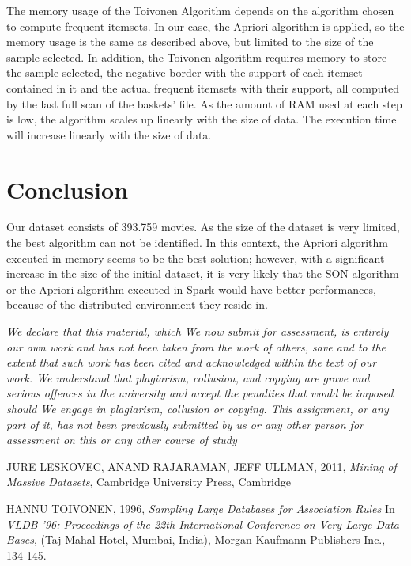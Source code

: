 \documentclass[conference,compsoc]{IEEEtran}
\theoremstyle{definition}
\begin{document}
The memory usage of the Toivonen Algorithm depends on the algorithm chosen to compute frequent itemsets. In our case, the Apriori algorithm is applied, so the memory usage is the same as described above, but limited to the size of the sample selected. In addition, the Toivonen algorithm requires memory to store the sample selected, the negative border with the support of each itemset contained in it and the actual frequent itemsets with their support, all computed by the last full scan of the baskets' file. As the amount of RAM used at each step is low, the algorithm scales up linearly with the size of data. The execution time will increase linearly with the size of data. 


\section{Conclusion}

Our dataset consists of 393.759 movies. As the size of the dataset is very limited, the best algorithm can not be identified. In this context, the Apriori algorithm executed in memory seems to be the best solution; however, with a significant increase in the size of the initial dataset, it is very likely that the SON algorithm or the Apriori algorithm executed in Spark would have better performances, because of the distributed environment they reside in.




\emph{We declare that this material, which We now submit for assessment, is entirely our own work and has not been taken from the work of others, save and to the extent that such work has been cited and acknowledged within the text of our work. We understand that plagiarism, collusion, and copying are grave and serious offences in the university and accept the penalties that would be imposed should We engage in plagiarism, collusion or copying. This assignment, or any part of it, has not been previously submitted by us or any other person for assessment on this or any other course of study}


\begin{thebibliography}{1}

JURE LESKOVEC, ANAND RAJARAMAN, JEFF ULLMAN, 2011, \emph{Mining of Massive Datasets}, Cambridge University Press, Cambridge

  \label{Toivonen}
HANNU TOIVONEN,  1996, \emph{Sampling Large Databases for Association Rules} In \emph{VLDB '96: Proceedings of the 22th International Conference on Very Large Data Bases}, (Taj Mahal Hotel, Mumbai, India), Morgan Kaufmann Publishers Inc., 134-145.
\end{thebibliography}
\end{document}
